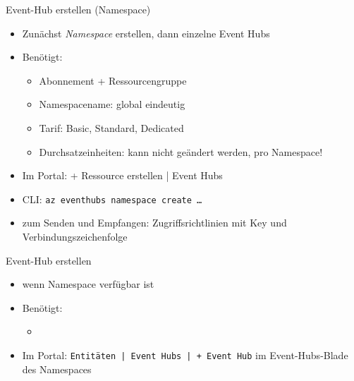\begin{flashcard}[Definition]{Event-Hub erstellen (Namespace)}
    \begin{itemize}
        \item Zunächst \emph{Namespace} erstellen, dann einzelne Event Hubs
        \item Benötigt:
            \begin{itemize}
                \item Abonnement + Ressourcengruppe
                \item Namespacename: global eindeutig
                \item Tarif: Basic, Standard, Dedicated
                \item Durchsatzeinheiten: kann nicht geändert werden, pro Namespace!
            \end{itemize}
        \item Im Portal: {+ Ressource erstellen | Event Hubs}
        \item CLI: \texttt{az eventhubs namespace create \ldots}
        \item zum Senden und Empfangen: Zugriffsrichtlinien mit Key und Verbindungszeichenfolge
    \end{itemize}
\end{flashcard}

\begin{flashcard}[Definition]{Event-Hub erstellen}
    \begin{itemize}
        \item wenn Namespace verfügbar ist
        \item Benötigt:
            \begin{itemize}
                \item
            \end{itemize}
        \item Im Portal: \texttt{Entitäten | Event Hubs | + Event Hub} im Event-Hubs-Blade des Namespaces
    \end{itemize}
\end{flashcard}

